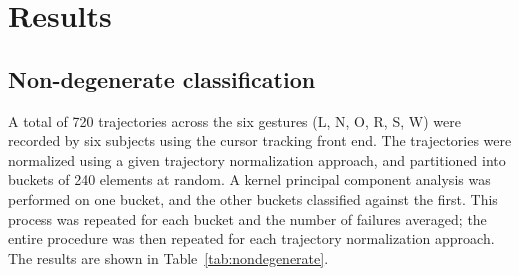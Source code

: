 \documentclass[12pt,journal,compsoc]{IEEEtran}
\begin{document}
\section{Results}

\subsection{Non-degenerate classification}

A total of 720 trajectories across the six gestures (L, N, O, R, S, W) were
recorded by six subjects using the cursor tracking front end. The trajectories
were normalized using a given trajectory normalization approach, and partitioned
into buckets of 240 elements at random. A kernel principal component analysis
was performed on one bucket, and the other buckets classified against the first.
This process was repeated for each bucket and the number of failures averaged;
the entire procedure was then repeated for each trajectory normalization approach.
The results are shown in Table~\ref{tab:nondegenerate}.
\end{document}
